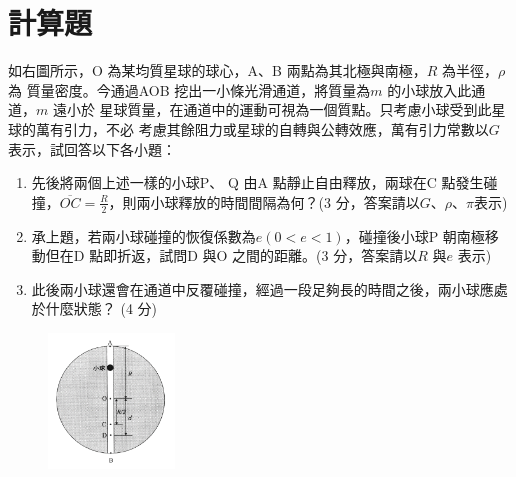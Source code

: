 \documentclass[cn,10pt,math=newtx]{elegantbook}
\begin{document}
\section{計算題}



\begin{example}
如右圖所示，O 為某均質星球的球心，A、B 兩點為其北極與南極，$R$ 為半徑，$\rho$為
質量密度。今通過AOB 挖出一小條光滑通道，將質量為$m$ 的小球放入此通道，$m$ 遠小於
星球質量，在通道中的運動可視為一個質點。只考慮小球受到此星球的萬有引力，不必
考慮其餘阻力或星球的自轉與公轉效應，萬有引力常數以$G$ 表示，試回答以下各小題：
\begin{enumerate}[label=(\arabic*)] 
  \item 先後將兩個上述一樣的小球P、 Q 由A 點靜止自由釋放，兩球在C 點發生碰撞，$\overline{OC} = \frac{R}{2}$，則兩小球釋放的時間間隔為何？(3 分，答案請以$G、\rho、\pi $表示)
  \item 承上題，若兩小球碰撞的恢復係數為$e (0< e <1)$，碰撞後小球P 朝南極移動但在D 點即折返，試問D 與O 之間的距離。(3 分，答案請以$R$ 與$e$ 表示)
  \item 此後兩小球還會在通道中反覆碰撞，經過一段足夠長的時間之後，兩小球應處於什麼狀態？ (4 分)
    \end{enumerate}
    \rightline{[台中女中教甄109]}
\end{example}
\begin{solution}
    
\end{solution}
\begin{figure}[htbp]
    \flushright
    \includegraphics[width=0.3\textwidth]{image/109中女21.png}
  \end{figure}
\newpage
\end{document}
